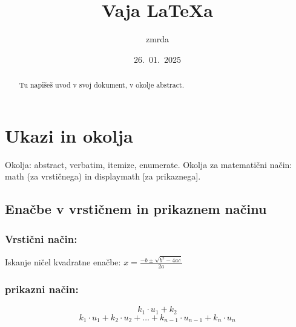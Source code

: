 \documentclass[a4paper]{article}
\begin{document}

\title{Vaja \LaTeX a}
\author{zmrda}
\date{26.\ 01.\ 2025}
\maketitle 


\begin{abstract}
    Tu napišeš uvod v svoj dokument, v okolje abstract.
\end{abstract}



\section{Ukazi in okolja}

Okolja: abstract, verbatim, itemize, enumerate. 
Okolja za matematični način: math (za vrstičnega) in displaymath 
[za prikaznega]. 


\subsection{Enačbe v vrstičnem in prikaznem načinu}
\subsubsection{Vrstični način:}
Iskanje ničel kvadratne enačbe: \(x = \frac{-b \pm \sqrt{b^2 - 4ac}}{2a}\)


\subsubsection{prikazni način:}
\begin{center}
   \[k_1\cdot u_1+k_2\]
   \[k_1 \cdot u_1 + k_2 \cdot u_2 + \ldots + k_{n-1} \cdot u_{n-1} + k_n \cdot u_n\]

\end{center}%
\end{document}
